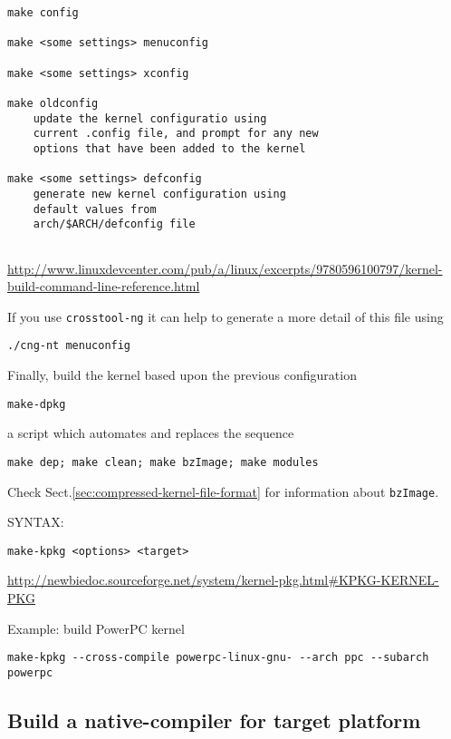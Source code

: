 \begin{verbatim}
make config

make <some settings> menuconfig

make <some settings> xconfig

make oldconfig
    update the kernel configuratio using
    current .config file, and prompt for any new
    options that have been added to the kernel
    
make <some settings> defconfig
    generate new kernel configuration using
    default values from
    arch/$ARCH/defconfig file
        
\end{verbatim}
\url{http://www.linuxdevcenter.com/pub/a/linux/excerpts/9780596100797/kernel-build-command-line-reference.html}

If you use \verb!crosstool-ng! it can help to generate a more detail of this
file using
\begin{verbatim}
./cng-nt menuconfig
\end{verbatim}


Finally, build the kernel based upon the previous configuration
\begin{verbatim}
make-dpkg
\end{verbatim}
a script which automates and replaces the sequence 
\begin{verbatim}
make dep; make clean; make bzImage; make modules
\end{verbatim}
Check Sect.\ref{sec:compressed-kernel-file-format} for information about \verb!bzImage!.

SYNTAX:
\begin{verbatim}
make-kpkg <options> <target>
\end{verbatim}
\url{http://newbiedoc.sourceforge.net/system/kernel-pkg.html#KPKG-KERNEL-PKG}

Example: build PowerPC kernel
\begin{verbatim}
make-kpkg --cross-compile powerpc-linux-gnu- --arch ppc --subarch powerpc
\end{verbatim}



\subsection{Build a native-compiler for target platform}
\label{sec:configure-environment-target-platform}

